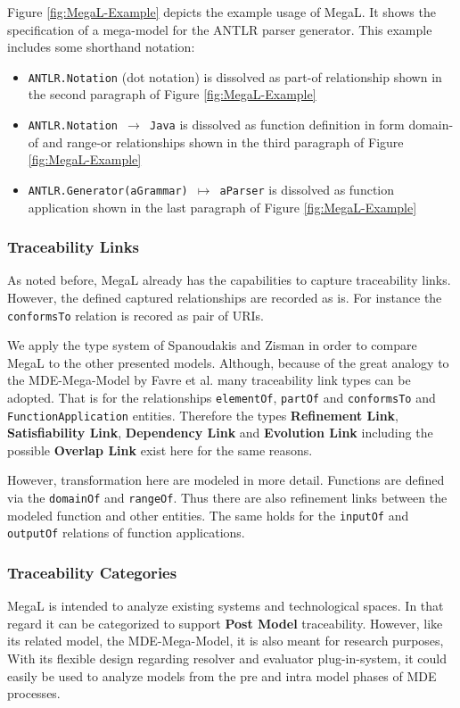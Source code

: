 \documentclass[runningheads,a4paper]{llncs}
\begin{document}
Figure \ref{fig:MegaL-Example} depicts the example usage of MegaL. 
It shows the specification of a mega-model for the ANTLR parser generator.
This example includes some shorthand notation:
\begin{itemize}

\item
\texttt{ANTLR.Notation}
(dot notation) is dissolved as part-of relationship shown in the second paragraph of Figure \ref{fig:MegaL-Example}

\item
\texttt{ANTLR.Notation $\rightarrow$ Java}
is dissolved as function definition in form domain-of and range-or relationships shown in the third paragraph of Figure \ref{fig:MegaL-Example}

\item 
\texttt{ANTLR.Generator(aGrammar) $\mapsto$ aParser}
is dissolved as function application shown in the last paragraph of Figure \ref{fig:MegaL-Example}

\end{itemize}

\subsubsection{Traceability Links}
As noted before, MegaL already has the capabilities to capture traceability links.
However, the defined captured relationships are recorded as is.
For instance the \texttt{conformsTo} relation is recored as pair of URIs.

We apply the type system of Spanoudakis and Zisman in order to compare MegaL to the other presented models.
Although, because of the great analogy to the MDE-Mega-Model by Favre et al. many traceability link types can be adopted.
That is for the relationships \texttt{elementOf}, \texttt{partOf} and \texttt{conformsTo} and \texttt{FunctionApplication} entities.
Therefore the types \textbf{Refinement Link}, \textbf{Satisfiability Link}, \textbf{Dependency Link} and \textbf{Evolution Link} including the possible \textbf{Overlap Link} exist here for the same reasons.

However, transformation here are modeled in more detail.
Functions are defined via the \texttt{domainOf} and \texttt{rangeOf}.
Thus there are also refinement links between the modeled function and other entities.
The same holds for the \texttt{inputOf} and \texttt{outputOf} relations of function applications.

\subsubsection{Traceability Categories}
MegaL is intended to analyze existing systems and technological spaces.
In that regard it can be categorized to support \textbf{Post Model} traceability.
However, like its related model, the MDE-Mega-Model, it is also meant for research purposes,
With its flexible design regarding resolver and evaluator plug-in-system, it could easily be used to analyze models from the pre and intra model phases of MDE processes.
\end{document}
